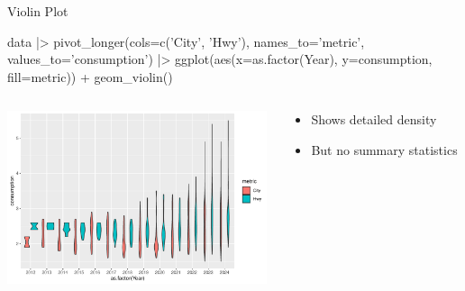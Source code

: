 \documentclass[ignorenonframetext,xcolor=x11names]{beamer}
\begin{document}
\begin{frame}[fragile]{Violin Plot}
\begin{Rcode}
data |>
  pivot_longer(cols=c('City', 'Hwy'), 
               names_to='metric', 
               values_to='consumption') |>
  ggplot(aes(x=as.factor(Year), y=consumption, fill=metric)) +
    geom_violin()
\end{Rcode}
\begin{columns}
\begin{column}{.75\textwidth}
  \includegraphics[height=2in]{fuel.violin.pdf}
\end{column}
\hspace{-.75in}
\begin{column}{.25\textwidth}
\footnotesize
\begin{itemize}
   \item Shows detailed density
   \item But no summary statistics
\end{itemize}
\end{column}
\end{columns}
\end{frame}


\end{document}
